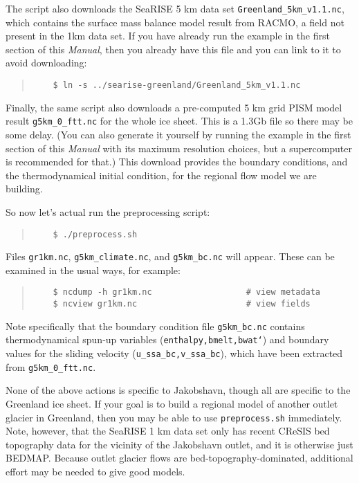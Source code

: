 The script also downloads the SeaRISE 5 km data set \texttt{Greenland_5km_v1.1.nc}, which contains the surface mass balance model result from RACMO, a field not present in the 1km data set.  If you have already run the example in the first section of this \emph{Manual}, then you already have this file and you can link to it to avoid downloading:
\begin{quote}\small
\begin{verbatim}
    $ ln -s ../searise-greenland/Greenland_5km_v1.1.nc
\end{verbatim}
\normalsize\end{quote}

Finally, the same script also downloads a pre-computed 5 km grid PISM model result \texttt{g5km_0_ftt.nc} for the whole ice sheet.  This is a 1.3Gb file so there may be some delay.  (You can also generate it yourself by running the example in the first section of this \emph{Manual} with its maximum resolution choices, but a supercomputer is recommended for that.)  This download provides the boundary conditions, and the thermodynamical initial condition, for the regional flow model we are building.

So now let's actual run the preprocessing script:
\begin{quote}\small
\begin{verbatim}
    $ ./preprocess.sh
\end{verbatim}
\normalsize\end{quote}
Files \texttt{gr1km.nc}, \texttt{g5km_climate.nc}, and \texttt{g5km_bc.nc} will appear.  These can be examined in the usual ways, for example:
\begin{quote}\small
\begin{verbatim}
    $ ncdump -h gr1km.nc                   # view metadata
    $ ncview gr1km.nc                      # view fields
\end{verbatim}
\normalsize\end{quote}
Note specifically that the boundary condition file \texttt{g5km_bc.nc} contains thermodynamical spun-up variables (\texttt{enthalpy,bmelt,bwat`}) and boundary values for the sliding velocity (\texttt{u_ssa_bc,v_ssa_bc}), which have been extracted from \texttt{g5km_0_ftt.nc}.

None of the above actions is specific to Jakobshavn, though all are specific to the Greenland ice sheet.  If your goal is to build a regional model of another outlet glacier in Greenland, then you may be able to use \texttt{preprocess.sh} immediately.  Note, however, that the SeaRISE 1 km data set only has recent CReSIS bed topography data for the vicinity of the Jakobshavn outlet, and it is otherwise just BEDMAP.  Because outlet glacier flows are bed-topography-dominated, additional effort may be needed to give good models.


